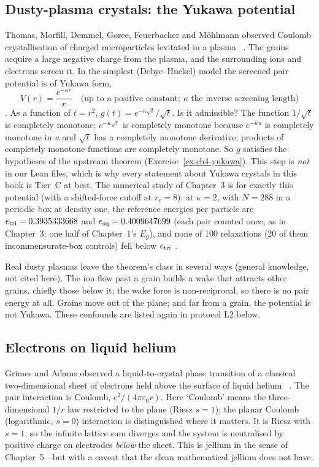 \subsection{Dusty-plasma crystals: the Yukawa potential}
Thomas, Morfill, Demmel, Goree, Feuerbacher and M\"ohlmann observed Coulomb crystallisation of charged
microparticles levitated in a plasma~\cite{thomas} \tierL. The grains acquire a large negative charge from the
plasma, and the surrounding ions and electrons screen it. In the simplest (Debye--H\"uckel) model the screened pair
potential is of Yukawa form,
\[
V(r) = \frac{e^{-\kappa r}}{r}\quad\text{(up to a positive constant; $\kappa$ the inverse screening length)}
\]
\tierC. As a function of $t=r^2$, $g(t) = e^{-\kappa\sqrt t}/\sqrt t$. Is it admissible? The function $1/\sqrt t$
is completely monotone; $e^{-\kappa\sqrt t}$ is completely monotone because $e^{-\kappa u}$ is completely monotone
in $u$ and $\sqrt t$ has a completely monotone derivative; products of completely monotone functions are
completely monotone. So $g$ satisfies the hypotheses of the upstream theorem \tierC{} (Exercise~\ref{ex:ch4-yukawa}).
This step is \emph{not} in our Lean files, which is why every statement about Yukawa crystals in this book is
Tier~C at best. The numerical study of Chapter~3 is for exactly this potential (with a shifted-force cutoff at
$r_c=8$): at $\kappa=2$, with $N=288$ in a periodic box at density one, the reference energies per particle are
$e_{\rm tri}=0.3935333668$ and $e_{\rm sq}=0.4009647699$ (each pair counted once, as in Chapter~3: one half of
Chapter~1's $E_g$), and none of 100 relaxations (20 of them
incommensurate-box controls) fell below $e_{\rm tri}$ \tierX.

Real dusty plasmas leave the theorem's class in several ways \tierC{} (general knowledge, not cited here). The ion
flow past a grain builds a wake that attracts other grains, chiefly those below it; the wake force is non-reciprocal,
so there is no pair energy at all. Grains move out of the plane; and far from a grain, the potential is not Yukawa. These confounds are listed again in
protocol L2 below.

\subsection{Electrons on liquid helium}
Grimes and Adams observed a liquid-to-crystal phase transition of a classical two-dimensional sheet of electrons held
above the surface of liquid helium~\cite{grimes} \tierL. The pair interaction is Coulomb,
$e^2/(4\pi\varepsilon_0 r)$. Here `Coulomb' means the three-dimensional $1/r$ law restricted to the plane (Riesz
$s=1$); the planar Coulomb (logarithmic, $s=0$) interaction is distinguished where it matters. It is Riesz with $s=1$, so the infinite lattice sum diverges and the system is neutralised
by positive charge on electrodes \emph{below} the sheet. This is jellium in the sense of Chapter~5---but with a
caveat that the clean mathematical jellium does not have.

